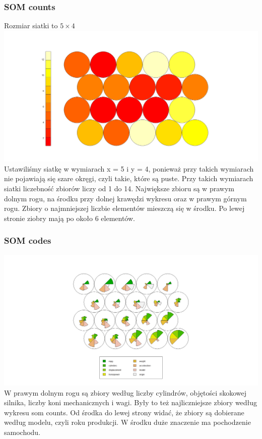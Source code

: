 \documentclass{article}
\begin{document}
        \subsubsection{SOM counts}    
            Rozmiar siatki to $5\times4$
            \newline
            \includegraphics[width = \textwidth]{som_counts_fig.jpeg}
            Ustawiliśmy siatkę w wymiarach x = 5 i y = 4, ponieważ przy takich wymiarach nie pojawiają się 
            szare okręgi, czyli takie, które są puste. Przy takich wymiarach siatki liczebność zbiorów liczy od 1 do 14. 
            Największe zbioru są w prawym dolnym rogu, na środku przy dolnej krawędzi wykresu oraz w prawym górnym rogu. 
            Zbiory o najmniejszej liczbie elementów mieszczą się w środku. Po lewej stronie ziobry mają po około 6 elementów.

        \subsubsection{SOM codes}   
            \includegraphics[width = \textwidth]{som_codes_fig.jpeg}
            W prawym dolnym rogu są zbiory według liczby cylindrów, objętości skokowej silnika, liczby koni mechanicznych i wagi. 
            Były to też najliczniejsze zbiory według wykresu som counts. Od środka do lewej strony widać, że zbiory są dobierane według 
            modelu, czyli roku produkcji. W środku duże znaczenie ma pochodzenie samochodu.
\end{document}
